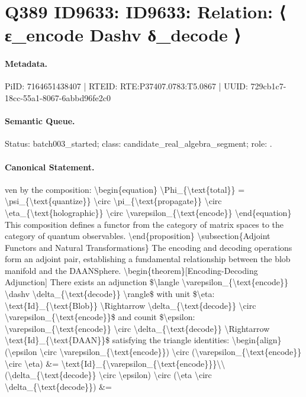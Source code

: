 \section*{Q389 ID9633: ID9633: Relation: ⟨ ε\_encode Dashv δ\_decode ⟩}
\paragraph{Metadata.}
PiID: 7164651438407 | RTEID: RTE:P37407.0783:T5.0867 | UUID: 729cb1c7-18cc-55a1-8067-6abbd96fe2c0

\paragraph{Semantic Queue.}
Status: batch003\_started; class: candidate\_real\_algebra\_segment; role: .

\paragraph{Canonical Statement.}
ven by the composition: \textbackslash{}begin\{equation\} \textbackslash{}Phi\_\{\textbackslash{}text\{total\}\} = \textbackslash{}psi\_\{\textbackslash{}text\{quantize\}\} \textbackslash{}circ \textbackslash{}pi\_\{\textbackslash{}text\{propagate\}\} \textbackslash{}circ \textbackslash{}eta\_\{\textbackslash{}text\{holographic\}\} \textbackslash{}circ \textbackslash{}varepsilon\_\{\textbackslash{}text\{encode\}\} \textbackslash{}end\{equation\} This composition defines a functor from the category of matrix spaces to the category of quantum observables. \textbackslash{}end\{proposition\} \textbackslash{}subsection\{Adjoint Functors and Natural Transformations\} The encoding and decoding operations form an adjoint pair, establishing a fundamental relationship between the blob manifold and the DAANSphere. \textbackslash{}begin\{theorem\}[Encoding-Decoding Adjunction] There exists an adjunction \$\textbackslash{}langle \textbackslash{}varepsilon\_\{\textbackslash{}text\{encode\}\} \textbackslash{}dashv \textbackslash{}delta\_\{\textbackslash{}text\{decode\}\} \textbackslash{}rangle\$ with unit \$\textbackslash{}eta: \textbackslash{}text\{Id\}\_\{\textbackslash{}text\{Blob\}\} \textbackslash{}Rightarrow \textbackslash{}delta\_\{\textbackslash{}text\{decode\}\} \textbackslash{}circ \textbackslash{}varepsilon\_\{\textbackslash{}text\{encode\}\}\$ and counit \$\textbackslash{}epsilon: \textbackslash{}varepsilon\_\{\textbackslash{}text\{encode\}\} \textbackslash{}circ \textbackslash{}delta\_\{\textbackslash{}text\{decode\}\} \textbackslash{}Rightarrow \textbackslash{}text\{Id\}\_\{\textbackslash{}text\{DAAN\}\}\$ satisfying the triangle identities: \textbackslash{}begin\{align\} (\textbackslash{}epsilon \textbackslash{}circ \textbackslash{}varepsilon\_\{\textbackslash{}text\{encode\}\}) \textbackslash{}circ (\textbackslash{}varepsilon\_\{\textbackslash{}text\{encode\}\} \textbackslash{}circ \textbackslash{}eta) \&= \textbackslash{}text\{Id\}\_\{\textbackslash{}varepsilon\_\{\textbackslash{}text\{encode\}\}\}\textbackslash{}\textbackslash{} (\textbackslash{}delta\_\{\textbackslash{}text\{decode\}\} \textbackslash{}circ \textbackslash{}epsilon) \textbackslash{}circ (\textbackslash{}eta \textbackslash{}circ \textbackslash{}delta\_\{\textbackslash{}text\{decode\}\}) \&=

